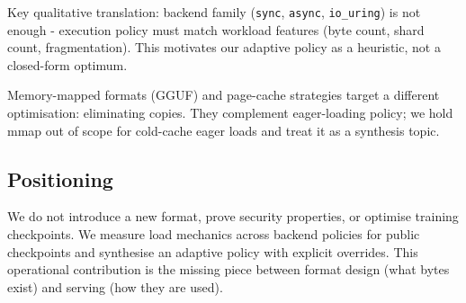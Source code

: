 Key qualitative translation: backend family (\texttt{sync}, \texttt{async}, \texttt{io\_uring}) is not enough - execution policy must match workload features (byte count, shard count, fragmentation). This motivates our adaptive policy as a heuristic, not a closed-form optimum.

Memory-mapped formats (GGUF) and page-cache strategies target a different optimisation: eliminating copies. They complement eager-loading policy; we hold mmap out of scope for cold-cache eager loads and treat it as a synthesis topic.

\subsection{Positioning}

We do not introduce a new format, prove security properties, or optimise training checkpoints. We measure load mechanics across backend policies for public checkpoints and synthesise an adaptive policy with explicit overrides. This operational contribution is the missing piece between format design (what bytes exist) and serving (how they are used).
